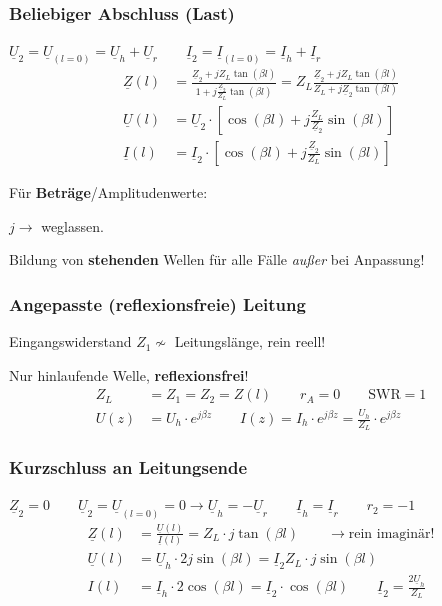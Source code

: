\subsubsection{Beliebiger Abschluss (Last)} \label{beliebig_abschluss}
$\underline{U}_2 = \underline{U}_{(l=0)} =  \underline{U}_h  +\underline{U}_r \qquad \underline{I}_2 = \underline{I}_{(l=0)} =  \underline{I}_h  +\underline{I}_r $
\begin{align*}
	\underline{Z}(l) & =
	\frac{\underline{Z}_2+jZ_L\tan(\beta
		l)}{1+ j \frac{\underline{Z}_2}{Z_L}\tan(\beta l)}
	= Z_L \frac{\underline{Z}_2 + j Z_L \tan(\beta l)}{Z_L + j \underline{Z}_2 \tan(\beta l)}                              \\
	\underline{U}(l) & = \underline{U}_2 \cdot \left[ \cos(\beta l) + j \tfrac{Z_L}{\underline{Z}_2} \sin(\beta l) \right] \\
	\underline{I}(l) & = \underline{I}_2 \cdot \left[ \cos(\beta l) + j \tfrac{\underline{Z}_2}{Z_L} \sin(\beta l) \right]
\end{align*}

Für \textbf{Beträge}/Amplitudenwerte: \quad {}

$j \rightarrow$ weglassen.

\vspace{1em}
Bildung von \textbf{stehenden} Wellen für alle Fälle \textit{außer} bei Anpassung!

\newpage
\subsubsection{Angepasste (reflexionsfreie) Leitung}
Eingangswiderstand $ Z_1\nsim$ Leitungslänge, rein reell!

Nur hinlaufende Welle, \textbf{reflexionsfrei}!
\begin{align*}
	Z_L  & = Z_1 = Z_2 = Z(l) \qquad
	r_A          =0 \qquad
	\mathrm{SWR} = 1                        \\
	U(z) & = U_h\cdot e ^{j\beta z}  \qquad
	I(z)         = I_h \cdot e^{j\beta z} = \frac{U_h}{Z_L}\cdot e^{j\beta z}
\end{align*}

\subsubsection{Kurzschluss an Leitungsende}
$ \underline{Z}_2 = 0 \qquad \underline{U}_2 = \underline{U}_{(l=0)} = 0 \rightarrow \underline{U}_h = - \underline{U}_r \qquad \underline{I}_h = \underline{I}_r \qquad r_2 = -1$
\begin{align*}
	\underline{Z}(l) & = \frac{\underline{U}(l)}{\underline{I}(l)} =  Z_L\cdot j\tan(\beta l)        \qquad \rightarrow \text{rein imaginär!}            \\
	\underline{U}(l) & =  \underline{U}_h  \cdot 2j\sin(\beta l) = \underline{I}_2 Z_L \cdot j\sin(\beta l)                                              \\
	I(l)             & = \underline{I}_h \cdot 2 \cos(\beta l) =\underline{I}_2 \cdot \cos(\beta l) \qquad \underline{I}_2 =\frac{2\underline{U}_h}{Z_L}
\end{align*}


